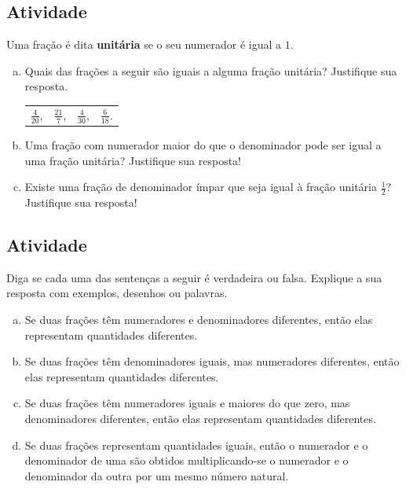 \subsection{Atividade}

Uma fração é dita {\bf unitária} se o seu numerador é igual a $1$. 
\begin{enumerate}[a)]
\item  Quais das frações a seguir são iguais a alguma fração unitária? Justifique sua resposta.

\begin{center}
\begin{tabular}{m{}m{}m{}m{}}
$\frac{4}{20}$, & $\frac{21}{7}$, & $\frac{4}{30}$, & $\frac{6}{18}$.
\end{tabular}
\end{center}

\item  Uma fração com numerador maior do que o denominador pode ser igual a uma fração unitária? Justifique sua resposta!

\item  Existe uma fração de denominador ímpar que seja igual à fração unitária $\frac{1}{2}$? Justifique sua resposta! 
\end{enumerate}

\subsection{Atividade}

Diga se cada uma das sentenças a seguir é verdadeira ou falsa. Explique a sua resposta com exemplos, desenhos ou palavras.
\begin{enumerate}[a)]
 \item  Se duas frações têm numeradores e denominadores diferentes, então elas representam quantidades diferentes.
 \item Se duas frações têm denominadores iguais, mas numeradores diferentes, então elas representam quantidades diferentes.
 \item Se duas frações têm numeradores iguais e maiores do que zero, mas denominadores diferentes, então elas representam quantidades diferentes.
 \item Se duas frações representam quantidades iguais, então o numerador e o denominador de uma são obtidos multiplicando-se o numerador e o denominador da outra por um mesmo número natural.
\end{enumerate}


